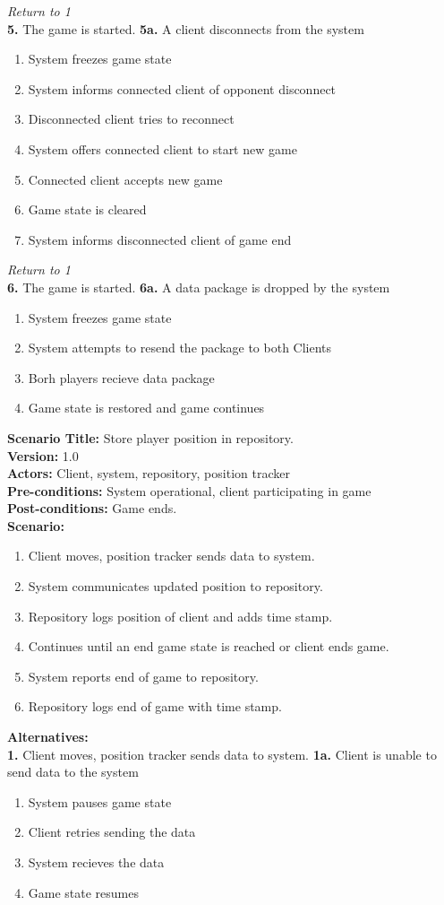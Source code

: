 \documentclass[letterpaper,12pt]{article}
\begin{document}
\emph{Return to 1}\\
\textbf{5.} The game is started.
\textbf{5a.} A client disconnects from the system
\begin{enumerate}
\item System freezes game state
\item System informs connected client of opponent disconnect
\item Disconnected client tries to reconnect
\item System offers connected client to start new game
\item Connected client accepts new game
\item Game state is cleared
\item System informs disconnected client of game end
\end{enumerate}
\emph{Return to 1}\\
\textbf{6.} The game is started.
\textbf{6a.} A data package is dropped by the system
\begin{enumerate}
\item System freezes game state
\item System attempts to resend the package to both Clients
\item Borh players recieve data package
\item Game state is restored and game continues
\end{enumerate}

\noindent \textbf{Scenario Title:} Store player position in repository.\\
\textbf{Version:} 1.0\\
\textbf{Actors:} Client, system, repository, position tracker\\
\textbf{Pre-conditions:} System operational, client participating in game\\
\textbf{Post-conditions:} Game ends.\\
\textbf{Scenario:}
\begin{enumerate}
\item Client moves, position tracker sends data to system.
\item System communicates updated position to repository.
\item Repository logs position of client and adds time stamp.
\item Continues until an end game state is reached or client ends game.
\item System reports end of game to repository.
\item Repository logs end of game with time stamp.
\end{enumerate}
\textbf{Alternatives:}\\
\textbf{1.} Client moves, position tracker sends data to system.
\textbf{1a.} Client is unable to send data to the system
\begin {enumerate}
\item System pauses game state
\item Client retries sending the data
\item System recieves the data
\item Game state resumes
\end {enumerate}
\end{document}
